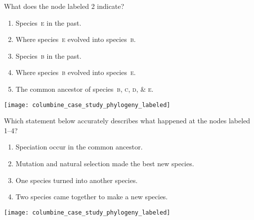 \documentclass[t,hidelinks]{beamer}
\newcommand{\ques}[1]{\highlight{\textsc{q#1:}}}
\begin{document}
%
{
\begin{frame}[t]{\ques4  What does the node labeled 2 indicate?}
	
	\begin{multicols}{2}
	\begin{enumerate}
		\item Species~\textsc{e} in the past.
		
		\item Where species~\textsc{e} evolved into species~\textsc{b}.
		
		\item Species~\textsc{b} in the past.

		\item Where species~\textsc{b} evolved into species~\textsc{e}.


		\item \alert<2>{The common ancestor of species~\textsc{b}, \textsc{c}, \textsc{d}, \& \textsc{e}.}

	\end{enumerate}
	
	\columnbreak
	
		\hfill \texttt{[image: columbine\_case\_study\_phylogeny\_labeled]}
	\end{multicols}
		
\end{frame}
}
%
\begin{frame}[t]{\ques5 Which statement below accurately describes what happened at the nodes labeled 1–4?}

	\begin{multicols}{2}
	\begin{enumerate}
		\item \alert<2>{Speciation occur in the common ancestor.}
		
		\item Mutation and natural selection made the best new species.  
		
		\item One species turned into another species.
		
		\item Two species came together to make a new species.
	\end{enumerate}
	
	\columnbreak
	
	\hfill \texttt{[image: columbine\_case\_study\_phylogeny\_labeled]}
	\end{multicols}
		
\end{frame}
\end{document}
